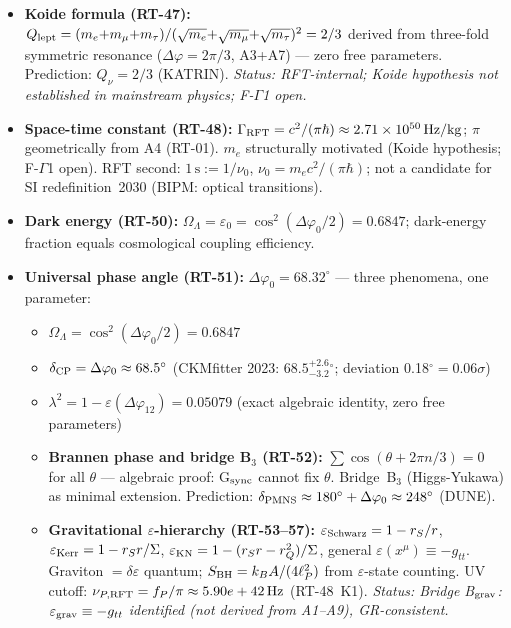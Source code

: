 \documentclass[12pt]{iopart}
\begin{document}
	\begin{itemize}
		\item \textbf{Koide formula (RT-47):}
		$Q_{\rm lept} = (m_e{+}m_\mu{+}m_\tau)/(\sqrt{m_e}{+}\sqrt{m_\mu}{+}\sqrt{m_\tau})^2 = 2/3$
		derived from three-fold symmetric resonance ($\Delta\varphi=2\pi/3$, A3+A7) ---
		zero free parameters. Prediction: $Q_\nu = 2/3$ (KATRIN).
		\textit{Status: RFT-internal; Koide hypothesis not established in mainstream physics; F-$\Gamma$1 open.}
		
		\item \textbf{Space-time constant (RT-48):}
		$\Gamma_{\rm RFT} = c^2/(\pi\hbar) \approx 2.71\times10^{50}\,{\rm Hz/kg}$;
		$\pi$ geometrically from A4 (RT-01). $m_e$ structurally motivated (Koide hypothesis;
		F-$\Gamma$1 open). RFT second: $1\,\mathrm{s} := 1/\nu_0$, $\nu_0=m_e c^2/(\pi\hbar)$;
		not a candidate for SI redefinition~2030 (BIPM: optical transitions).
		
		\item \textbf{Dark energy (RT-50):}
		$\Omega_\Lambda = \varepsilon_0 = \cos^2(\Delta\varphi_0/2) = 0.6847$;
		dark-energy fraction equals cosmological coupling efficiency.
		
		\item \textbf{Universal phase angle (RT-51):}
		$\Delta\varphi_0 = 68.32^\circ$ --- three phenomena, one parameter:
		\begin{itemize}
			\item $\Omega_\Lambda = \cos^2(\Delta\varphi_0/2) = 0.6847$
			\item $\delta_{\rm CP} = \Delta\varphi_0 \approx 68.5^\circ$
			(CKMfitter 2023: $68.5^{+2.6}_{-3.2}{}^\circ$; deviation 0.18$^\circ = 0.06\sigma$)
			\item $\lambda^2 = 1 - \varepsilon(\Delta\varphi_{12}) = 0.05079$
			(exact algebraic identity, zero free parameters)

		\item \textbf{Brannen phase and bridge B$_3$ (RT-52):}
		$\sum\cos(\theta+2\pi n/3)=0$ for all $\theta$ --- algebraic proof:
		G$_{\rm sync}$ cannot fix $\theta$. Bridge~B$_3$
		(Higgs-Yukawa) as minimal extension. Prediction:
		$\delta_{\rm PMNS}\approx 180^\circ+\Delta\varphi_0\approx 248^\circ$ (DUNE).

		\item \textbf{Gravitational $\varepsilon$-hierarchy (RT-53--57):}
		$\varepsilon_{\rm Schwarz}=1-r_S/r$,
		$\varepsilon_{\rm Kerr}=1-r_Sr/\Sigma$,
		$\varepsilon_{\rm KN}=1-(r_Sr-r_Q^2)/\Sigma$,
		general $\varepsilon(x^\mu)\equiv-g_{tt}$.
		Graviton $= \delta\hat\varepsilon$ quantum;
		$S_{\rm BH} = k_B A/(4\ell_P^2)$ from $\varepsilon$-state counting.
		UV cutoff: $\nu_{P,{\rm RFT}} = f_P/\pi \approx 5.90e+42\,{\rm Hz}$ (RT-48~K1).
		\textit{Status: Bridge B$_{\rm grav}$: $\varepsilon_{\rm grav}\equiv-g_{tt}$
		identified (not derived from A1--A9), GR-consistent.}


\end{itemize}
\end{itemize}
\end{document}
